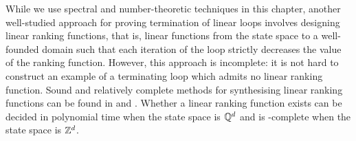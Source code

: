 While we use spectral and number-theoretic techniques in this chapter,
another well-studied approach for proving termination of linear loops
involves designing linear ranking functions, that is, linear functions
from the state space to a well-founded domain such that each iteration
of the loop strictly decreases the value of the ranking
function. However, this approach is incomplete: it is not hard to
construct an example of a terminating loop which admits no linear
ranking function.  Sound and relatively complete methods for
synthesising linear ranking functions can be found in
\cite{PodelskiR04} and \cite{Ben-AmramG13}. Whether a linear
ranking function exists can be decided in polynomial time when the
state space is $\mathbb{Q}^{d}$ and is \coNP-complete when the
state space is $\mathbb{Z}^{d}$.
